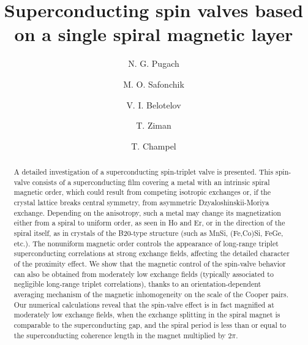\documentclass[prb,amsmath,amssymb,reprint]{revtex4-2}
\begin{document}
\title{
Superconducting spin valves based on a single spiral magnetic layer
}

\author{N. G. Pugach}



\author{M. O. Safonchik}

\author{V. I. Belotelov}



\author{T. Ziman}


\author{T. Champel}



\begin{abstract}
A detailed investigation of a superconducting spin-triplet valve is presented. This spin-valve consists of a superconducting film covering a metal with an intrinsic spiral magnetic order, which could result  from  competing isotropic exchanges or, if the crystal lattice breaks  central symmetry, from  asymmetric Dzyaloshinskii-Moriya exchange.
Depending on the anisotropy, such a metal may change its magnetization  either from a spiral to  uniform order, as seen in Ho and Er,
 or in the direction of the spiral itself, as in crystals of the B20-type structure (such as  MnSi, (Fe,Co)Si, FeGe, etc.).
The nonuniform
magnetic order controls the appearance of long-range triplet superconducting
correlations at strong exchange fields,
affecting  the detailed character of the
proximity effect.
We show that the magnetic control of the spin-valve behavior can also be obtained from moderately low exchange fields (typically associated to negligible long-range triplet correlations),
thanks to an orientation-dependent averaging mechanism of the magnetic inhomogeneity on the scale of the Cooper pairs.
Our numerical calculations reveal that the spin-valve effect is in fact magnified at moderately low exchange fields, when the exchange splitting in the spiral magnet is comparable to the superconducting gap, and the spiral period is less than or equal to the superconducting coherence length in the magnet multiplied by $2\pi$.




\end{abstract}
\end{document}
